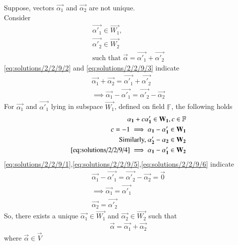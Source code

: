Suppose, vectors $\vec{\alpha_1}$ and $\vec{\alpha_2}$ are not unique.\\ Consider
\begin{align}
 \vec{\alpha'_1} \in \vec{W_1},\\
 \vec{\alpha'_2} \in \vec{W_2}\\
 \text{such that }  \vec{\alpha}=\vec{\alpha'_1}+\vec{\alpha'_2}\label{eq:solutions/2/2/9/3}
\end{align}
\eqref{eq:solutions/2/2/9/2} and \eqref{eq:solutions/2/2/9/3} indicate
\begin{align}
 \vec{\alpha_1}+\vec{\alpha_2}=\vec{\alpha'_1}+\vec{\alpha'_2}  \\
 \implies  \vec{\alpha_1}- \vec{\alpha'_1}= \vec{\alpha'_2}- \vec{\alpha_2}\label{eq:solutions/2/2/9/4}
\end{align}
For $\vec{\alpha_1}$ and $\vec{\alpha'_1}$ lying in subspace $\vec{W_1}$, defined on field $\mathbb{F}$,  the following holds
\begin{align}
   \vec{\alpha_1}+c\vec{\alpha'_1} \in \vec{W_1}, c\in \mathbb{F}\\
   c=-1\implies \vec{\alpha_1}-\vec{\alpha'_1} \in \vec{W_1}\label{eq:solutions/2/2/9/5}\\
   \text{Similarly, }\vec{\alpha'_2}-\vec{\alpha_2} \in \vec{W_2}\\
   \eqref{eq:solutions/2/2/9/4}\implies  \vec{\alpha_1}-\vec{\alpha'_1} \in \vec{W_2}\label{eq:solutions/2/2/9/6}
   \end{align}
\eqref{eq:solutions/2/2/9/1},\eqref{eq:solutions/2/2/9/5},\eqref{eq:solutions/2/2/9/6} indicate
\begin{align}
    \vec{\alpha_1}-\vec{\alpha'_1}=\vec{\alpha'_2}-\vec{\alpha_2}=\vec{0}\\
    \implies \vec{\alpha_1}=\vec{\alpha'_1}\\
    \vec{\alpha_2}=\vec{\alpha'_2}
\end{align}
So, there exists a unique $\vec{\alpha_1} \in \vec{W_1}$ and $\vec{\alpha_2} \in \vec{W_2}$ such that 
\begin{align}
   \vec{\alpha}=\vec{\alpha_1}+\vec{\alpha_2}  
\end{align}
where $\vec{\alpha} \in \vec{V}$

